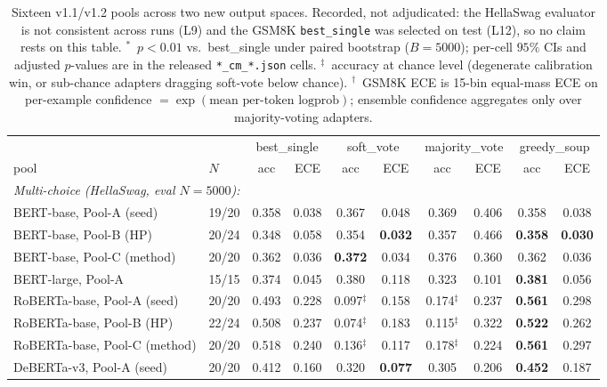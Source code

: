 \documentclass[11pt]{article}
\begin{document}
\begin{table}[t]
\centering
\caption{Sixteen v1.1/v1.2 pools across two new output spaces. Recorded, not adjudicated: the HellaSwag evaluator is not consistent across runs (L9) and the GSM8K \texttt{best\_single} was selected on test (L12), so no claim rests on this table. $^{*}$~$p{<}0.01$ vs.\ best\_single under paired bootstrap ($B{=}5000$); per-cell $95\%$ CIs and adjusted $p$-values are in the released \texttt{*\_cm\_*.json} cells. $^{\ddagger}$~accuracy at chance level (degenerate calibration win, or sub-chance adapters dragging soft-vote below chance). $^{\dagger}$~GSM8K ECE is 15-bin equal-mass ECE on per-example confidence $=\exp(\text{mean per-token logprob})$; ensemble confidence aggregates only over majority-voting adapters.}
\label{tab:v11cells}
\small
\setlength{\tabcolsep}{4pt}
\begin{tabular}{ll|cc|cc|cc|cc}
\toprule
& & \multicolumn{2}{c|}{best\_single} & \multicolumn{2}{c|}{soft\_vote} & \multicolumn{2}{c|}{majority\_vote} & \multicolumn{2}{c}{greedy\_soup} \\
pool & $N$ & acc & ECE & acc & ECE & acc & ECE & acc & ECE \\
\midrule
\multicolumn{10}{l}{\emph{Multi-choice (HellaSwag, eval $N{=}5000$):}} \\
\quad BERT-base, Pool-A (seed)         & 19/20 & 0.358 & 0.038 & 0.367 & 0.048 & 0.369 & 0.406 & 0.358 & 0.038 \\
\quad BERT-base, Pool-B (HP)           & 20/24 & 0.348 & 0.058 & 0.354 & \textbf{0.032} & 0.357 & 0.466 & \textbf{0.358} & \textbf{0.030} \\
\quad BERT-base, Pool-C (method)       & 20/20 & 0.362 & 0.036 & \textbf{0.372} & 0.034 & 0.376 & 0.360 & 0.362 & 0.036 \\
\quad BERT-large, Pool-A               & 15/15 & 0.374 & 0.045 & 0.380 & 0.118 & 0.323 & 0.101 & \textbf{0.381} & 0.056 \\
\quad RoBERTa-base, Pool-A (seed)      & 20/20 & 0.493 & 0.228 & 0.097$^{\ddagger}$ & 0.158 & 0.174$^{\ddagger}$ & 0.237 & \textbf{0.561} & 0.298 \\
\quad RoBERTa-base, Pool-B (HP)        & 22/24 & 0.508 & 0.237 & 0.074$^{\ddagger}$ & 0.183 & 0.115$^{\ddagger}$ & 0.322 & \textbf{0.522} & 0.262 \\
\quad RoBERTa-base, Pool-C (method)    & 20/20 & 0.518 & 0.240 & 0.136$^{\ddagger}$ & 0.117 & 0.178$^{\ddagger}$ & 0.224 & \textbf{0.561} & 0.297 \\
\quad DeBERTa-v3, Pool-A (seed)        & 20/20 & 0.412 & 0.160 & 0.320 & \textbf{0.077} & 0.305 & 0.206 & \textbf{0.452} & 0.187 \\

\end{tabular}
\end{table}
\end{document}

